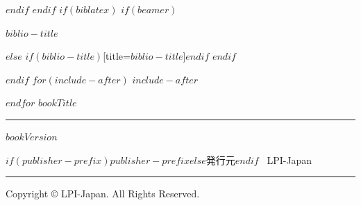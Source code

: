 \documentclass[
$if(fontsize)$
  $fontsize$,
$endif$
$if(papersize)$
  $papersize$paper,
$endif$
$if(beamer)$
  ignorenonframetext,
$if(handout)$
  handout,
$endif$
$if(aspectratio)$
  aspectratio=$aspectratio$,
$endif$
$endif$
$for(classoption)$
  $classoption$$sep$,
$endfor$
]{$documentclass$}
\newif\ifbibliography
\newcounter{none} %
\begin{document}
$endif$
$endif$
$if(biblatex)$
$if(beamer)$
\begin{frame}[allowframebreaks]{$biblio-title$}
  \bibliographytrue
  \printbibliography[heading=none]
\end{frame}
$else$
\printbibliography$if(biblio-title)$[title=$biblio-title$]$endif$
$endif$

$endif$
$for(include-after)$
$include-after$

$endfor$
\newpage
\thispagestyle{empty}
  \vspace*{\fill}
  {\LARGE $bookTitle$}

  \rule{\textwidth}{0.5pt}

  $bookVersion$

  $if(publisher-prefix)$$publisher-prefix$$else$発行元$endif$ \, LPI-Japan

  \rule{\textwidth}{0.5pt}

  Copyright \copyright{} LPI-Japan. All Rights Reserved.

  \vspace*{1cm}
\end{document}
